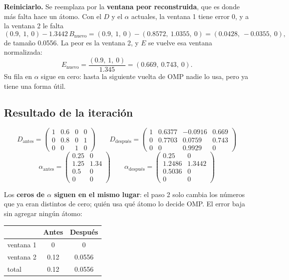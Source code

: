 \documentclass[11pt,letterpaper]{article}
\begin{document}
\textbf{Reiniciarlo.} Se reemplaza por la \textbf{ventana peor
reconstruida}, que es donde más falta hace un átomo. Con el $D$ y el
$\alpha$ actuales, la ventana 1 tiene error 0, y a la ventana 2 le
falta
\[
    (0.9,\ 1,\ 0) - 1.3442\, B_{\text{nuevo}}
    = (0.9,\ 1,\ 0) - (0.8572,\ 1.0355,\ 0)
    = (0.0428,\ -0.0355,\ 0),
\]
de tamaño 0.0556. La peor es la ventana 2, y $E$ se vuelve esa ventana
normalizada:
\[
    E_{\text{nuevo}} = \frac{(0.9,\ 1,\ 0)}{1.345}
                     = (0.669,\ 0.743,\ 0) .
\]
Su fila en $\alpha$ sigue en cero: hasta la siguiente vuelta de OMP
nadie lo usa, pero ya tiene una forma útil.

\subsection*{Resultado de la iteración}

\[
    D_{\text{antes}} =
    \begin{pmatrix}
        1 & 0.6 & 0 & 0 \\
        0 & 0.8 & 0 & 1 \\
        0 & 0   & 1 & 0
    \end{pmatrix}
    \qquad
    D_{\text{después}} =
    \begin{pmatrix}
        1 & 0.6377 & -0.0916 & 0.669 \\
        0 & 0.7703 &  0.0759 & 0.743 \\
        0 & 0      &  0.9929 & 0
    \end{pmatrix}
\]
\[
    \alpha_{\text{antes}} =
    \begin{pmatrix}
        0.25 & 0    \\
        1.25 & 1.34 \\
        0.5  & 0    \\
        0    & 0
    \end{pmatrix}
    \qquad
    \alpha_{\text{después}} =
    \begin{pmatrix}
        0.25   & 0      \\
        1.2486 & 1.3442 \\
        0.5036 & 0      \\
        0      & 0
    \end{pmatrix}
\]

\begin{resultado}
    Los \textbf{ceros de $\alpha$ siguen en el mismo lugar}: el paso 2
    solo cambia los números que ya eran distintos de cero; quién usa
    qué átomo lo decide OMP. El error baja sin agregar ningún átomo:
    \begin{center}
    \begin{tabular}{lcc}
        \toprule
                   & \textbf{Antes} & \textbf{Después} \\
        \midrule
        ventana 1  & 0              & 0 \\
        ventana 2  & 0.12           & 0.0556 \\
        total      & 0.12           & 0.0556 \\
        \bottomrule
    \end{tabular}
    \end{center}
\end{resultado}
\end{document}
